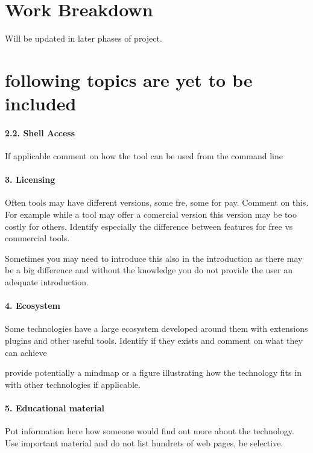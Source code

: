 \documentclass[9pt,twocolumn,twoside]{styles/osajnl}
\begin{document}
\appendix

\section{Work Breakdown}
Will be updated in later phases of project.
\section{following topics are yet to be included}

\paragraph{2.2. Shell Access}

If applicable comment on how the tool can be used from the command line

\paragraph{3. Licensing}

Often tools may have different versions, some fre, some for
pay. Comment on this. For example while a tool may offer a comercial
version this version may be too costly for others. Identify especially
the difference between features for free vs commercial tools.

Sometimes you may need to introduce this also in the introduction as
there may be a big difference and without the knowledge you do not
provide the user an adequate introduction.

\paragraph{4. Ecosystem}

Some technologies have a large ecosystem developed around them with
extensions plugins and other useful tools. Identify if they exists and
comment on what they can achieve

provide potentially a mindmap or a figure illustrating how the
technology fits in with other technologies if applicable.


\paragraph{5. Educational material}

Put information here how someone would find out more about the
technology. Use important material and do not list hundrets of web
pages, be selective.
\end{document}
